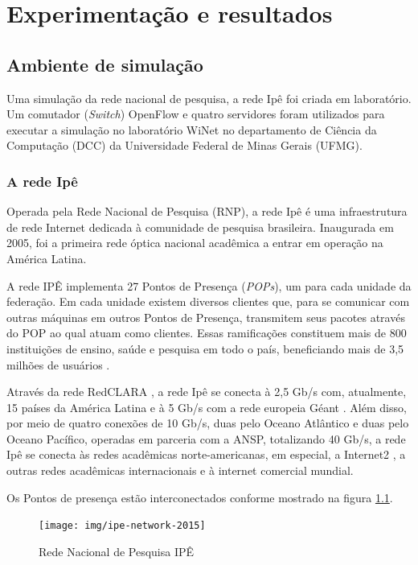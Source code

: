 \chapter{Experimentação e resultados}
\label{cap:experiments}

\section{Ambiente de simulação}

Uma simulação da rede nacional de pesquisa, a rede Ipê \citep{ipe2015network}
foi criada em laboratório.
Um comutador (\emph{Switch}) OpenFlow e quatro servidores foram utilizados
para executar a simulação no laboratório WiNet \citep{winet22015lab}
no departamento de Ciência da Computação (DCC) da Universidade Federal
de Minas Gerais (UFMG).

\subsection{A rede Ipê}
Operada pela Rede Nacional de Pesquisa (RNP), a rede Ipê é uma infraestrutura
de rede Internet dedicada à comunidade de pesquisa brasileira.
Inaugurada em 2005, foi a primeira rede óptica nacional acadêmica a entrar em
operação na América Latina.

A rede IPÊ implementa 27 Pontos de Presença (\emph{POPs}), um para cada unidade
da federação.
Em cada unidade existem diversos clientes que, para se comunicar com outras
máquinas em outros Pontos de Presença, transmitem seus pacotes através do
POP ao qual atuam como clientes.
Essas ramificações constituem mais de 800 instituições de ensino, saúde e
pesquisa em todo o país, beneficiando mais de 3,5 milhões de usuários
\citep{ipe2015network}.

Através da rede RedCLARA \citep{redclara2015network}, a rede Ipê se conecta
à 2,5 Gb/s com, atualmente, 15 países da América Latina e à 5 Gb/s com a rede
europeia Géant \citep{geant2015network}.
Além disso, por meio de quatro conexões de
10 Gb/s, duas pelo Oceano Atlântico e duas pelo Oceano Pacífico,
operadas em parceria com a ANSP, totalizando 40 Gb/s, a rede Ipê se conecta
às redes acadêmicas norte-americanas, em especial, a  Internet2
\citep{internet22015network}, a outras redes acadêmicas internacionais e à
internet comercial mundial.

Os Pontos de presença estão interconectados conforme mostrado na figura
\ref{fig:ipe-network-2015}.

\begin{figure}[!ht]
    \centering
    \label{fig:ipe-network-2015}
    \texttt{[image: img/ipe-network-2015]}
    \caption{Rede Nacional de Pesquisa IPÊ \protect\footnotemark}
    \vspace*{3in}
\end{figure}

